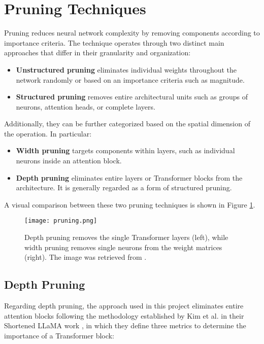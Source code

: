 \section{Pruning Techniques} \label{pruning}

Pruning reduces neural network complexity by removing components according to importance criteria. The technique operates through two distinct main approaches that differ in their granularity and organization:

\begin{itemize}
    \item \textbf{Unstructured pruning} eliminates individual weights throughout the network randomly or based on an importance criteria such as magnitude.
    \item \textbf{Structured pruning} removes entire architectural units such as groups of neurons, attention heads, or complete layers.
\end{itemize}
Additionally, they can be further categorized based on the spatial dimension of the operation. In particular:
\begin{itemize}
    \item \textbf{Width pruning} targets components within layers, such as individual neurons inside an attention block.
    \item \textbf{Depth pruning} eliminates entire layers or Transformer blocks from the architecture. It is generally regarded as a form of structured pruning.
\end{itemize}
A visual comparison between these two pruning techniques is shown in Figure \ref{fig:pruning_comparison}.

\begin{figure}[htbp]
    \centering
    \texttt{[image: pruning.png]}
    \caption[Comparison of Depth and Width Pruning]{Depth pruning removes the single Transformer layers (left), while width pruning removes single neurons from the weight matrices (right). The image was retrieved from \cite{shortened_llama}.}
    \label{fig:pruning_comparison}
\end{figure}

\subsection{Depth Pruning} \label{depth_pruning}

Regarding depth pruning, the approach used in this project eliminates entire attention blocks following the methodology established by Kim et al. in their Shortened LLaMA work \cite{shortened_llama}, in which they define three metrics to determine the importance of a Transformer block:

